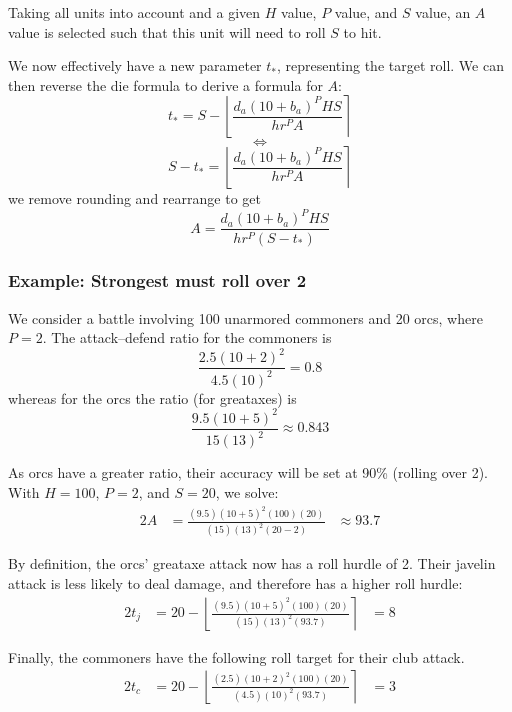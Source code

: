 \documentclass[twocolumn]{article}
\begin{document}
Taking all units into account and a given $H$ value, $P$ value, and $S$ value,
an $A$ value is selected such that this unit will need to roll $S$ to hit.

We now effectively have a new parameter $t_*$, representing the target roll.
We can then reverse the die formula to derive a formula for $A$:
\[
    t_* =
        S -
        \left\lfloor
            \frac
                {d_a (10 + b_{a})^P H S}
                {h r^P A}
        \right\rceil
\]
\[
    \iff
\]
\[
    S - t_* =
        \left\lfloor
            \frac
                {d_a (10 + b_{a})^P H S}
                {h r^P A}
        \right\rceil
\]
we remove rounding and rearrange to get
\[
    A = 
        \frac
            {d_a (10 + b_{a})^P H S}
            {h r^P (S - t_*)}
\]

\subsubsection{Example: Strongest must roll over 2}

We consider a battle involving 100 unarmored commoners and 20 orcs,
where $P = 2$.
The attack--defend ratio for the commoners is
\[
    \frac
        {2.5 (10 + 2)^2}
        {4.5 (10)^2}
    =
    0.8
\]
whereas for the orcs the ratio (for greataxes) is
\[
    \frac
        {9.5 (10 + 5)^2}
        {15 (13)^2}
    \approx
    0.843
\]

As orcs have a greater ratio, their accuracy will be set at 90\% (rolling over 2).
With $H = 100$, $P = 2$, and $S = 20$,
we solve:
\begin{alignat*}{2}
    A &= 
        \frac
            {(9.5) (10 + 5)^2 (100) (20)}
            {(15) (13)^2 (20 - 2)}
        &{}\approx 93.7
\end{alignat*}

By definition, the orcs' greataxe attack now has a roll hurdle of 2.
Their javelin attack is less likely to deal damage,
and therefore has a higher roll hurdle:
\begin{alignat*}{2}
    t_j &=
        20 -
        \left\lfloor
            \frac
                {(9.5) (10 + 5)^2 (100) (20)}
                {(15) (13)^2 (93.7)}
        \right\rceil
            &= 8
\end{alignat*}

Finally, the commoners have the following roll target
for their club attack.
\begin{alignat*}{2}
    t_c &=
        20 -
        \left\lfloor
            \frac
                {(2.5) (10 + 2)^2 (100) (20)}
                {(4.5) (10)^2 (93.7)}
        \right\rceil
            &= 3
\end{alignat*}
\end{document}
